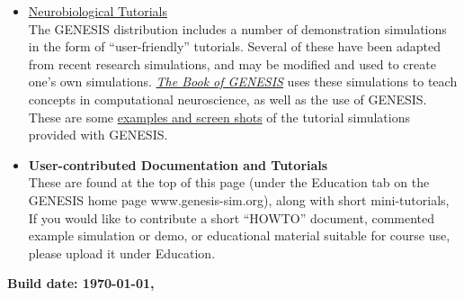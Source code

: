 \documentclass[12pt]{article}
\begin{document}
\begin{itemize}
\item \href{http://www.genesis-sim.org/GENESIS/Tutorials_summary.html}{Neurobiological Tutorials}\\
The GENESIS distribution includes a number of demonstration simulations in the form of ``user-friendly'' tutorials. Several of these have been adapted from recent research simulations, and may be modified and used to create one's own simulations. \href{http://www.genesis-sim.org/GENESIS/bog/bog.html}{\it The Book of GENESIS} uses these simulations to teach concepts in computational neuroscience, as well as the use of GENESIS. These are some  \href{http://www.genesis-sim.org/GENESIS/illtuts/illtuts.html}{examples and screen shots} of the tutorial simulations provided with GENESIS.

\item {\bf User-contributed Documentation and Tutorials}\\
These are found at the top of this page (under the Education tab on the GENESIS home page www.genesis-sim.org), along with short mini-tutorials, If you would like to contribute a short ``HOWTO'' document, commented example simulation or demo, or educational material suitable for course use, please upload it under Education.

\end{itemize}

{\bf Build date: \today, \thistime}
\end{document}
